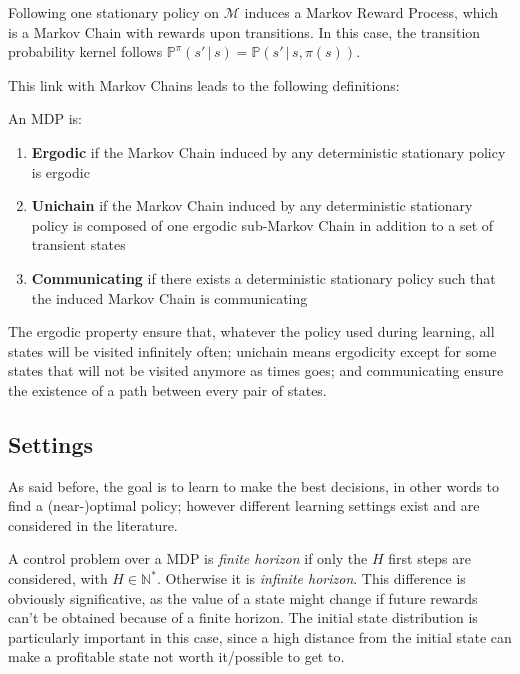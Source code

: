 Following one stationary policy on $\mathcal{M}$ induces a Markov Reward Process, which is a Markov Chain with rewards upon transitions. In this case, the transition probability kernel follows $\mathbb{P}^\pi(s' \,|\, s) = \mathbb{P}(s' \,|\, s, \pi(s))$.

This link with Markov Chains leads to the following definitions:

\begin{defi}
  An MDP is:
  \begin{enumerate}
  \item \textbf{Ergodic} if the Markov Chain induced by any deterministic stationary policy is ergodic
  \item \textbf{Unichain} if the Markov Chain induced by any deterministic stationary policy is composed of one ergodic sub-Markov Chain in addition to a set of transient states
  \item \textbf{Communicating} if there exists a deterministic stationary policy such that the induced Markov Chain is communicating
  \end{enumerate}
\end{defi}

The ergodic property ensure that, whatever the policy used during learning, all states will be visited infinitely often; unichain means ergodicity except for some states that will not be visited anymore as times goes; and communicating ensure the existence of a path between every pair of states.

\subsection{Settings}
\label{subsec:MDP-settings}

As said before, the goal is to learn to make the best decisions, in other words to find a (near-)optimal policy; however different learning settings exist and are considered in the literature.

A control problem over a MDP is \emph{finite horizon} if only the $H$ first steps are considered, with $H \in \mathbb{N}^*$. Otherwise it is \emph{infinite horizon}. This difference is obviously significative, as the value of a state might change if future rewards can't be obtained because of a finite horizon. The initial state distribution is particularly important in this case, since a high distance from the initial state can make a profitable state not worth it/possible to get to.

